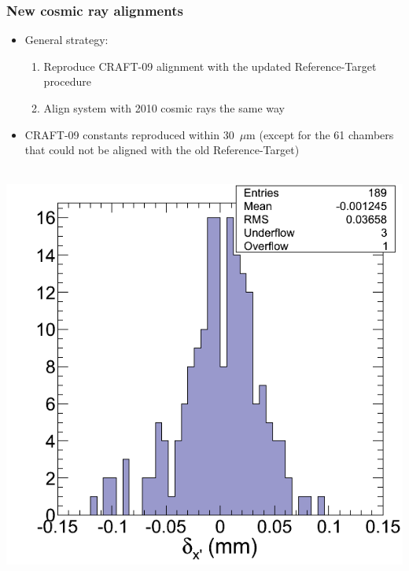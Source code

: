\documentclass[compress]{beamer}
\begin{document}
\begin{frame}
\frametitle{New cosmic ray alignments}

\begin{itemize}
\item General strategy:
\begin{enumerate}
\item Reproduce CRAFT-09 alignment with the updated Reference-Target procedure
\item Align system with 2010 cosmic rays the same way
\end{enumerate}

\item CRAFT-09 constants reproduced within 30~$\mu$m (except for the 61 chambers that could not be aligned with the old Reference-Target)
\end{itemize}

\vfill
\mbox{ } \hfill \includegraphics[width=0.5\linewidth]{craft09_redo3.png} \hfill \mbox{ }
\end{frame}
\end{document}
